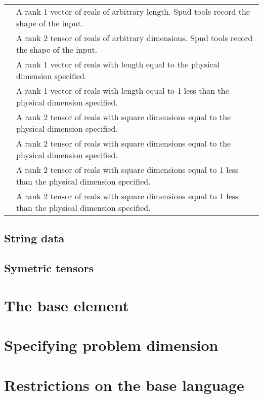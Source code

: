 \documentclass[a4paper, 11pt]{book}
\begin{document}
\begin{longtable}{lp{8cm}}
\lstinline *real_vector* & A rank 1 vector of reals of arbitrary length.  Spud tools record the shape of the input. \\
\lstinline *real_tensor* & A rank 2 tensor of reals of arbitrary dimensions.  Spud tools record the shape of the input. \\
\lstinline *real_dim_vector* & A rank 1 vector of reals with length equal to the physical dimension specified. \\
\lstinline *real_dim_minus_one_vector* & A rank 1 vector of reals with length equal to 1 less than the physical dimension specified. \\
\lstinline *real_dim_tensor* & A rank 2 tensor of reals with square dimensions equal to the physical dimension specified. \\
\lstinline *real_dim_symmetric_tensor* & A rank 2 tensor of reals with square dimensions equal to the physical dimension specified. \\
\lstinline *real_dim_minus_one_tensor* & A rank 2 tensor of reals with square dimensions equal to 1 less than the physical dimension specified. \\
\lstinline *real_dim_minus_one_symmetric_tensor* & A rank 2 tensor of reals with square dimensions equal to 1 less than the physical dimension specified.
\end{longtable}

\subsection{String data}

\subsection{Symetric tensors}

\section{The base element}

\section{Specifying problem dimension }

\section{Restrictions on the base language}
\end{document}
